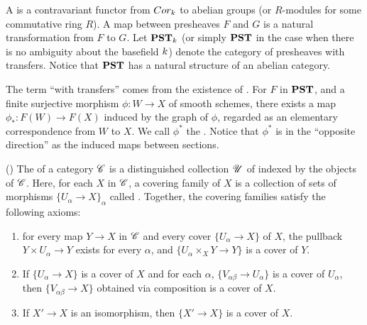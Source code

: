 \begin{defn}\label{def_pst}
A  is a contravariant functor from 
$Cor_k$ to abelian groups (or $R$-modules for some commutative 
ring $R$). A map between presheaves $F$ and $G$ is a natural 
transformation from $F$ to $G$. Let $\mathbf{PST}_{k}$ (or simply 
$\mathbf{PST}$ in the case when there is no ambiguity about the basefield 
$k$) denote the category of presheaves with transfers. 
Notice that $\mathbf{PST}$ has a natural structure of an abelian category.
\end{defn}

\begin{rmk}
The term ``with transfers'' comes from the existence of 
. For $F$ in $\mathbf{PST}$, and a finite surjective
morphism $\phi : W \to X$ of smooth schemes, there exists a
map $\phi_*: F(W) \to F(X)$ induced by the graph of $\phi$,
regarded as an elementary correspondence from $W$ to $X$.
We call $\phi^*$ the . Notice that $\phi^*$
is in the ``opposite direction'' as the induced maps between
sections.
\end{rmk}

\begin{defn}\label{def_groth_top} (\cite[II.1.3]{SGA4})
The  of a category $\mathscr{C}$ 
is a distinguished collection $\mathscr{U}$ of  
indexed by the objects of $\mathscr{C}$. Here, for each $X$ in $\mathscr{C}$,
a covering family of $X$ is a collection of sets of morphisms 
$\{U_\alpha \to X\}_\alpha$ called . Together, 
the covering families satisfy the following axioms:

\begin{enumerate}
\item for every map $Y \to X$ in $\mathscr{C}$ and every cover 
$\{U_\alpha \to X\}$ of $X$, the pullback $Y \times U_\alpha \to 
Y$ exists for every $\alpha$, and $\{U_\alpha \times_X Y \to Y\}$ 
is a cover of $Y$.

\item If $\{U_\alpha \to X\}$ is a cover of $X$ and for each 
$\alpha$, $\{V_{\alpha\beta} \to U_\alpha\}$ is a cover of 
$U_\alpha$, then $\{V_{\alpha\beta} \to X\}$ obtained via 
composition is a cover of $X$.

\item If $X' \to X$ is an isomorphism, then $\{X' \to X\}$ is a 
cover of $X$.
\end{enumerate}
\end{defn}

